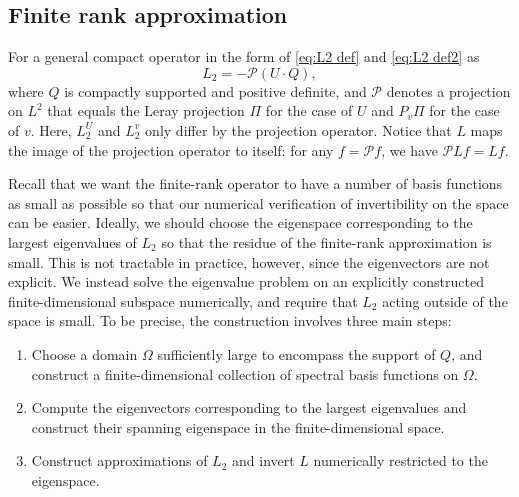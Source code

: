 \documentclass[11pt,a4paper]{article}
\numberwithin{equation}{section}
\newenvironment{enumeratenumeric}{\begin{enumerate}[1.] }{\end{enumerate}}
\begin{document}
\subsection{Finite rank approximation}
\label{subsec:finiterank}
For a general compact operator in the form of \eqref{eq:L2 def} and \eqref{eq:L2 def2} as \begin{equation}
    L_2=-\mathcal{P}(U\cdot Q),\label{L22 def}
\end{equation} where $Q$ is compactly supported and positive definite, and $\mathcal{P}$ denotes a projection on $L^2$ that equals the Leray projection $\Pi$ for the case of $U$ and $P_{\overline v}\Pi$ for the case of $v$. Here, $L_2^U$ and $L_2^v$ only differ by the projection operator. Notice that $L$ maps the image of the projection operator to itself: for any $f=\mathcal{P} f$, we have $\mathcal{P} L f=L f$. 

Recall that we want the finite-rank operator to have a number of basis functions as small as possible so that our numerical verification of invertibility on the space can be easier. 
Ideally, we should choose the eigenspace corresponding to the largest eigenvalues of $L_2$ so that the residue of the finite-rank approximation is small. This is not tractable in practice, however, since the eigenvectors are not explicit. We instead solve the eigenvalue problem on an explicitly constructed finite-dimensional subspace numerically, and require that $L_2$ acting outside of the space is small.
To be precise, the construction involves three main steps:
\begin{enumeratenumeric}
  \item Choose a domain $\Omega$ sufficiently large to encompass
  the support of $Q$, and construct a finite-dimensional collection of spectral basis functions on $\Omega$. 
  
  \item Compute the eigenvectors corresponding to the largest eigenvalues and
  construct their spanning eigenspace in the finite-dimensional space.   
  
  \item Construct
  approximations of $L_2$ and invert $L$ numerically restricted to the eigenspace. 
\end{enumeratenumeric}
\end{document}
